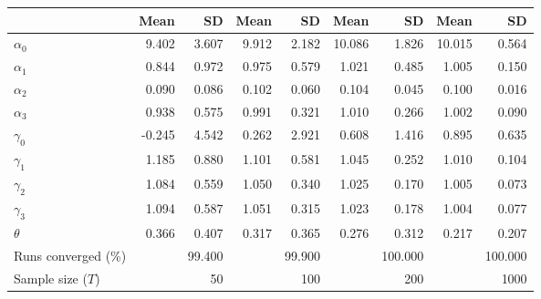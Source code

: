 
\begin{tabular}[t]{lrrrrrrrr}
\toprule
  & Mean & SD & Mean  & SD  & Mean   & SD   & Mean    & SD   \\
\midrule
$\alpha_{0}$ & 9.402 & 3.607 & 9.912 & 2.182 & 10.086 & 1.826 & 10.015 & 0.564\\
$\alpha_{1}$ & 0.844 & 0.972 & 0.975 & 0.579 & 1.021 & 0.485 & 1.005 & 0.150\\
$\alpha_{2}$ & 0.090 & 0.086 & 0.102 & 0.060 & 0.104 & 0.045 & 0.100 & 0.016\\
$\alpha_{3}$ & 0.938 & 0.575 & 0.991 & 0.321 & 1.010 & 0.266 & 1.002 & 0.090\\
$\gamma_{0}$ & -0.245 & 4.542 & 0.262 & 2.921 & 0.608 & 1.416 & 0.895 & 0.635\\
$\gamma_{1}$ & 1.185 & 0.880 & 1.101 & 0.581 & 1.045 & 0.252 & 1.010 & 0.104\\
$\gamma_{2}$ & 1.084 & 0.559 & 1.050 & 0.340 & 1.025 & 0.170 & 1.005 & 0.073\\
$\gamma_{3}$ & 1.094 & 0.587 & 1.051 & 0.315 & 1.023 & 0.178 & 1.004 & 0.077\\
$\theta$ & 0.366 & 0.407 & 0.317 & 0.365 & 0.276 & 0.312 & 0.217 & 0.207\\
Runs converged (\%) &  & 99.400 &  & 99.900 &  & 100.000 &  & 100.000\\
Sample size ($T$) &  & 50 &  & 100 &  & 200 &  & 1000\\
\bottomrule
\end{tabular}
